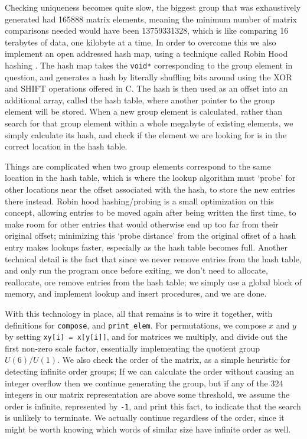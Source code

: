Checking uniqueness becomes quite slow, the biggest group that was exhaustively generated had 165888 matrix elements, meaning the minimum number of matrix comparisons needed would have been 13759331328, which is like comparing 16 terabytes of data, one kilobyte at a time. In order to overcome this we also implement an open addressed hash map, using a technique called Robin Hood hashing \cite{robin-hood}. The hash map takes the \verb`void*` corresponding to the group element in question, and generates a hash by literally shuffling bits around using the XOR and SHIFT operations offered in C. The hash is then used as an offset into an additional array, called the hash table, where another pointer to the group element will be stored. When a new group element is calculated, rather than search for that group element within a whole megabyte of existing elements, we simply calculate its hash, and check if the element we are looking for is in the correct location in the hash table.

Things are complicated when two group elements correspond to the same location in the hash table, which is where the lookup algorithm must `probe' for other locations near the offset associated with the hash, to store the new entries there instead. Robin hood hashing/probing is a small optimization on this concept, allowing entries to be moved again after being written the first time, to make room for other entries that would otherwise end up too far from their original offset; minimizing this `probe distance' from the original offset of a hash entry makes lookups faster, especially as the hash table becomes full. Another technical detail is the fact that since we never remove entries from the hash table, and only run the program once before exiting, we don't need to allocate, reallocate, ore remove entries from the hash table; we simply use a global block of memory, and implement lookup and insert procedures, and we are done.

With this technology in place, all that remains is to wire it together, with definitions for \verb`compose`, and \verb`print_elem`. For permutations, we compose $x$ and $y$ by setting \verb`xy[i] = x[y[i]]`, and for matrices we multiply, and divide out the first non-zero scale factor, essentially implementing the quotient group $U(6)/U(1)$. We also check the order of the matrix, as a simple heuristic for detecting infinite order groups; If we can calculate the order without causing an integer overflow then we continue generating the group, but if any of the 324 integers in our matrix representation are above some threshold, we assume the order is infinite, represented by \verb`-1`, and print this fact, to indicate that the search is unlikely to terminate. We actually continue regardless of the order, since it might be worth knowing which words of similar size have infinite order as well.

